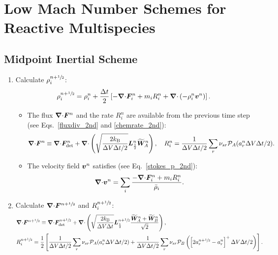 \documentclass[
10pt
showpacs, showkeys,
amsmath,amssymb,
aps,
pre,
floatfix,
]{revtex4-1}
\newcommand{\divg}{{\V\nabla\cdot}}                       %
\begin{document}
\section*{Low Mach Number Schemes for Reactive Multispecies}

\subsection{Midpoint Inertial Scheme}

\begin{enumerate}

\item Calculate $\rho^{n+\sfrac{1}{2}}_i$:
\begin{equation}
\rho^{n+\myhalf}_i = \rho^n_i + \frac{\D{t}}{2} \left[ -\divg\V{F}^n_i + m_i R^n_i + \divg\left( -\rho^n_i \V{v}^n \right) \right].
\end{equation}
\begin{itemize}
\item The flux $\divg\V{F}^n$ and the rate $R^n_i$ are available from the previous time step (see Eqs.~\eqref{fluxdiv_2nd} and \eqref{chemrate_2nd}):
\begin{equation}
\divg\V{F}^n \equiv \divg\V{F}^n_\mathrm{det} + \divg\left( \sqrt{ \frac{2k_\mathrm{B}}{\D{V}\D{t}/2} } \V{L}^n_{\frac12} \widetilde{\V{W}}^n_A \right),
\quad R^n_i = \frac{1}{\D{V}\D{t}/2} \sum_r \nu_{sr} \mathcal{P}_A(a^n_r\D{V}\D{t}/2).
\end{equation}
\item The velocity field $\boldsymbol{v}^n$ satisfies (see Eq.~\eqref{stokes_p_2nd}):
\begin{equation}
\divg\V{v}^n = \sum_i \frac{ -\divg\V{F}^n_i + m_i R^n_i }{\bar{\rho}_i}.
\end{equation}
\end{itemize}

\item Calculate $\divg\V{F}^{n+\myhalf}$ and $R^{n+\sfrac{1}{2}}_i$:
\begin{align}
&\divg\V{F}^{n+\myhalf} \equiv \divg\V{F}_\mathrm{det}^{n+\myhalf} + \divg\left( \sqrt{ \frac{2k_\mathrm{B}}{\D{V}\D{t}} } \V{L}^{n+\myhalf}_{\frac12} \frac{ \widetilde{\V{W}}^n_A + \widetilde{\V{W}}^n_B }{\sqrt{2}} \right), \\
&R^{n+\myhalf}_i = \frac{1}{2}\left[ \frac{1}{\D{V}\D{t}/2} \sum_r \nu_{sr} \mathcal{P}_A(a^n_r\D{V}\D{t}/2) + \frac{1}{\D{V}\D{t}/2} \sum_r \nu_{sr} \mathcal{P}_B\left( \left[ 2 a^{n+\myhalf}_r - a^n_r \right]^+ \D{V}\D{t}/2 \right) \right].
\end{align}


\end{enumerate}
\end{document}
